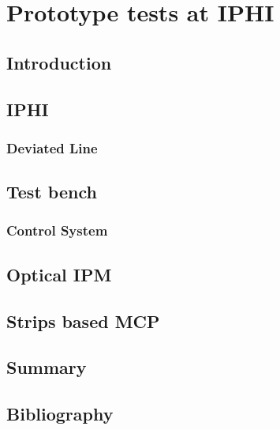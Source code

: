 \chapter{Prototype tests at IPHI}
\cleardoublepage

\minitoc

\section{Introduction}
\begin{refsection}
  \label{ch4:Introduction}

	\section{IPHI}
	\subsection{Deviated Line}
	\section{Test bench}
	\subsection{Control System}
	\section{Optical IPM}
	\section{Strips based MCP}

	\section{Summary}
	\label{ch4:Summary}

	\cleardoublepage
	\section{Bibliography}
	\label{ch4:bib}
	\printbibliography[heading=subbibliography]
\end{refsection}